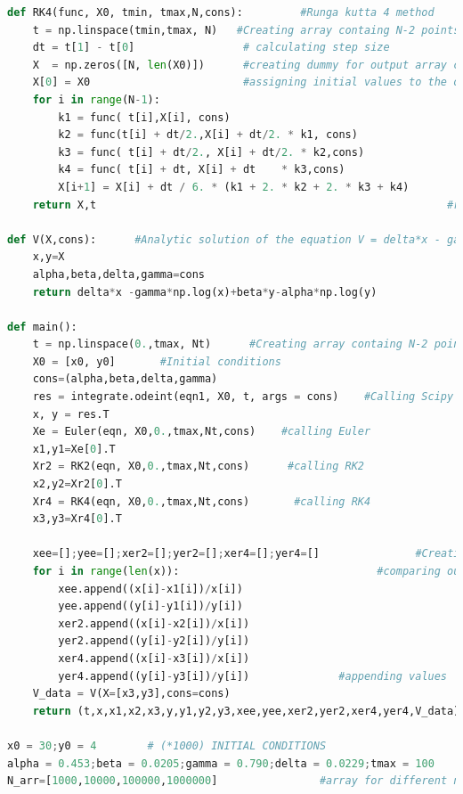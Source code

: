 \documentclass[12pt]{article}
\begin{document}
\begin{lstlisting}[language=Python, caption=Python example]
def RK4(func, X0, tmin, tmax,N,cons):         #Runga kutta 4 method
    t = np.linspace(tmin,tmax, N)   #Creating array containg N-2 points between tmin and tmax (Basically calculation points)
    dt = t[1] - t[0]                 # calculating step size
    X  = np.zeros([N, len(X0)])      #creating dummy for output array containing x,y values
    X[0] = X0                        #assigning initial values to the output array
    for i in range(N-1):
        k1 = func( t[i],X[i], cons)
        k2 = func(t[i] + dt/2.,X[i] + dt/2. * k1, cons)
        k3 = func( t[i] + dt/2., X[i] + dt/2. * k2,cons)
        k4 = func( t[i] + dt, X[i] + dt    * k3,cons)
        X[i+1] = X[i] + dt / 6. * (k1 + 2. * k2 + 2. * k3 + k4)           #Updating values of the dummy array that we created 
    return X,t                                                       #returns array of updated values of X and array t

def V(X,cons):      #Analytic solution of the equation V = delta*x - gamma*ln(x)+beta*y-alpha*ln(y)   
    x,y=X
    alpha,beta,delta,gamma=cons
    return delta*x -gamma*np.log(x)+beta*y-alpha*np.log(y)

def main():
    t = np.linspace(0.,tmax, Nt)      #Creating array containg N-2 points between tmin and tmax (Basically calculation points)
    X0 = [x0, y0]       #Initial conditions
    cons=(alpha,beta,delta,gamma)
    res = integrate.odeint(eqn1, X0, t, args = cons)    #Calling Scipy's odeint function
    x, y = res.T
    Xe = Euler(eqn, X0,0.,tmax,Nt,cons)    #calling Euler
    x1,y1=Xe[0].T
    Xr2 = RK2(eqn, X0,0.,tmax,Nt,cons)      #calling RK2
    x2,y2=Xr2[0].T
    Xr4 = RK4(eqn, X0,0.,tmax,Nt,cons)       #calling RK4
    x3,y3=Xr4[0].T

    xee=[];yee=[];xer2=[];yer2=[];xer4=[];yer4=[]               #Creating empty lists for appending values of abs(odeint-numrical method(euler/rk2/rk4))/odeint
    for i in range(len(x)):                               #comparing our results of Euler,RK2,RK4 with Scipy's ODEint for finding error
        xee.append((x[i]-x1[i])/x[i])
        yee.append((y[i]-y1[i])/y[i])
        xer2.append((x[i]-x2[i])/x[i])
        yer2.append((y[i]-y2[i])/y[i])
        xer4.append((x[i]-x3[i])/x[i])
        yer4.append((y[i]-y3[i])/y[i])              #appending values 
    V_data = V(X=[x3,y3],cons=cons)
    return (t,x,x1,x2,x3,y,y1,y2,y3,xee,yee,xer2,yer2,xer4,yer4,V_data) 

x0 = 30;y0 = 4        # (*1000) INITIAL CONDITIONS     
alpha = 0.453;beta = 0.0205;gamma = 0.790;delta = 0.0229;tmax = 100        #Assigning values of parameters
N_arr=[1000,10000,100000,1000000]                #array for different number of steps


\end{lstlisting}
\end{document}
